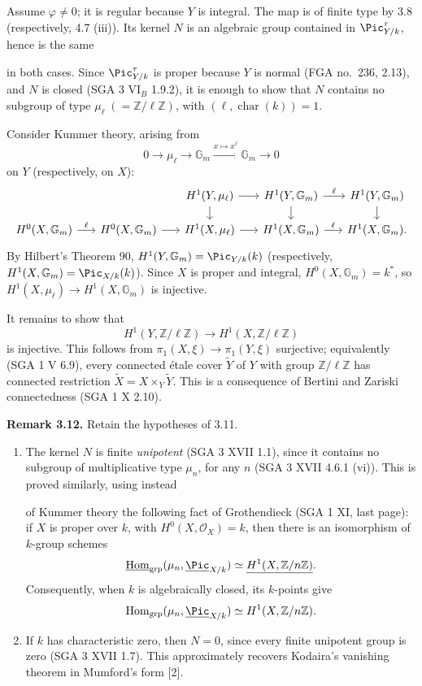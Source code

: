 Assume \(\varphi\ne0\); it is regular because \(Y\) is integral. The map
is of finite type by 3.8 (respectively, 4.7 (iii)). Its kernel \(N\) is
an algebraic group contained in \(\Pic^\tau_{Y/k}\), hence is the same

in both cases. Since \(\Pic^\tau_{Y/k}\) is proper because \(Y\) is
normal (FGA no.~236, 2.13), and \(N\) is closed (SGA 3 VI\(_B\) 1.9.2),
it is enough to show that \(N\) contains no subgroup of type
\(\mu_\ell\;(=\mathbb Z/\ell\mathbb Z)\), with
\((\ell,\operatorname{char}(k))=1\).

Consider Kummer theory, arising from
\[
0\longrightarrow\mu_\ell\longrightarrow\mathbb G_m
\xrightarrow{x\mapsto x^\ell}\mathbb G_m\longrightarrow0
\]
on \(Y\) (respectively, on \(X\)):
\[
\begin{tikzcd}[column sep=1.6em,row sep=1.2em]
&&H^1(Y,\mu_\ell)\arrow[r]\arrow[d]&
H^1(Y,\mathbb G_m)\arrow[r,"\ell"]\arrow[d]&
H^1(Y,\mathbb G_m)\arrow[d]\\
H^0(X,\mathbb G_m)\arrow[r,"\ell"]&
H^0(X,\mathbb G_m)\arrow[r]&
H^1(X,\mu_\ell)\arrow[r]&
H^1(X,\mathbb G_m)\arrow[r,"\ell"]&
H^1(X,\mathbb G_m).
\end{tikzcd}
\]
By Hilbert's Theorem 90, \(H^1(Y,\mathbb G_m)=\Pic_{Y/k}(k)\)
(respectively, \(H^1(X,\mathbb G_m)=\Pic_{X/k}(k)\)). Since \(X\) is
proper and integral, \(H^0(X,\mathbb G_m)=k^*\), so
\(H^1(X,\mu_\ell)\to H^1(X,\mathbb G_m)\) is injective.

It remains to show that
\[
H^1(Y,\mathbb Z/\ell\mathbb Z)\longrightarrow
H^1(X,\mathbb Z/\ell\mathbb Z)
\]
is injective. This follows from \(\pi_1(X,\xi)\to\pi_1(Y,\xi)\)
surjective; equivalently (SGA 1 V 6.9), every connected \'etale cover
\(\widetilde Y\) of \(Y\) with group \(\mathbb Z/\ell\mathbb Z\) has
connected restriction \(\widetilde X=X\times_Y\widetilde Y\). This is a
consequence of Bertini and Zariski connectedness (SGA 1 X 2.10).

\textbf{Remark 3.12.} Retain the hypotheses of 3.11.
\begin{enumerate}[label=(\roman*)]
\item The kernel \(N\) is finite \emph{unipotent} (SGA 3 XVII 1.1),
since it contains no subgroup of multiplicative type \(\mu_n\), for any
\(n\) (SGA 3 XVII 4.6.1 (vi)). This is proved similarly, using instead

of Kummer theory the following fact of Grothendieck (SGA 1 XI, last
page): if \(X\) is proper over \(k\), with \(H^0(X,\mathcal O_X)=k\),
then there is an isomorphism of \(k\)-group schemes
\[
\underline{\operatorname{Hom}}_{\mathrm{grp}}
(\mu_n,\underline{\Pic}_{X/k})
\simeq \underline{H^1(X,\mathbb Z/n\mathbb Z)}.
\]
Consequently, when \(k\) is algebraically closed, its \(k\)-points give
\[
\operatorname{Hom}_{\mathrm{grp}}(\mu_n,\underline{\Pic}_{X/k})
\simeq H^1(X,\mathbb Z/n\mathbb Z).
\]
\item If \(k\) has characteristic zero, then \(N=0\), since every finite
unipotent group is zero (SGA 3 XVII 1.7). This approximately recovers
Kodaira's vanishing theorem in Mumford's form [2].
\end{enumerate}


